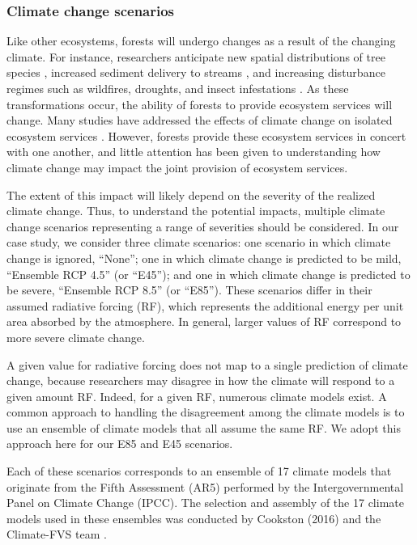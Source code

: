\subsubsection{Climate change scenarios}
\label{sec:climateChange}
Like other ecosystems, forests will undergo changes as a result of the changing climate. For instance, researchers anticipate new spatial distributions of tree species \cite{iverson1998predicting}, increased sediment delivery to streams \cite{Goode20121}, and increasing disturbance regimes such as wildfires, droughts, and insect infestations \cite{vose2012effects}. As these transformations occur, the ability of forests to provide ecosystem services will change. Many studies have addressed the effects of climate change on isolated ecosystem services \cite{vose2012effects}\cite{bonan2008forests}\cite{mckenzie2004climatic}. However, forests provide these ecosystem services in concert with one another, and little attention has been given to understanding how climate change may impact the joint provision of ecosystem services.

The extent of this impact will likely depend on the severity of the realized climate change. Thus, to understand the potential impacts, multiple climate change scenarios representing a range of severities should be considered. In our case study, we consider three climate scenarios: one scenario in which climate change is ignored, ``None''; one in which climate change is predicted to be mild, ``Ensemble RCP 4.5'' (or ``E45''); and one in which climate change is predicted to be severe, ``Ensemble RCP 8.5'' (or ``E85''). These scenarios differ in their assumed radiative forcing (RF), which represents the additional energy per unit area absorbed by the atmosphere. In general, larger values of RF correspond to more severe climate change.

A given value for radiative forcing does not map to a single prediction of climate change, because researchers may disagree in how the climate will respond to a given amount RF. Indeed, for a given RF, numerous climate models exist. A common approach to handling the disagreement among the climate models is to use an ensemble of climate models that all assume the same RF. We adopt this approach here for our E85 and E45 scenarios.

Each of these scenarios corresponds to an ensemble of 17 climate models that originate from the Fifth Assessment (AR5) performed by the Intergovernmental Panel on Climate Change (IPCC). The selection and assembly of the 17 climate models used in these ensembles was conducted by Cookston (2016) and the Climate-FVS team \cite{ClimateModelsInFVSEnsemble}.


